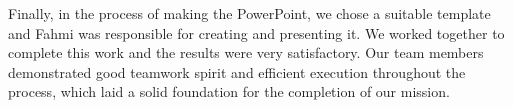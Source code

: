 \documentclass[UTF8,a4paper,AutoFakeBold,AutoFakeSlant]{article}
\begin{document}
Finally, in the process of making the PowerPoint, we chose a suitable template and Fahmi was responsible for creating and presenting it. We worked together to complete this work and the results were very satisfactory. Our team members demonstrated good teamwork spirit and efficient execution throughout the process, which laid a solid foundation for the completion of our mission.



% 


\end{document}
